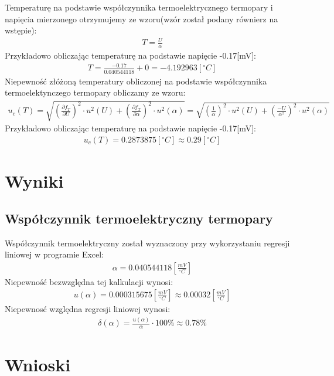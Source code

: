 \documentclass[11pt]{article}
\begin{document}
    \noindent Temperaturę na podstawie współczynnika termoelektrycznego termopary i napięcia mierzonego otrzymujemy ze wzoru(wzór został podany równierz na wstępie):
    \begin{gather*}
        T=\frac{U}{\alpha}
    \end{gather*}
    \noindent Przykładowo obliczając temperaturę na podstawie napięcie -0.17[mV]:
    \begin{gather*}
        T=\frac{-0.17}{0.040544118}+0=-4.192963[^{\circ}C]
    \end{gather*}
    \noindent Niepewność złóżoną temperatury obliczonej na podstawie współczynnika termoelektynczego termopary obliczamy ze wzoru:
    \begin{gather*}
        u_c(T)=\sqrt{(\frac{\partial f_T}{\partial U})^2\cdot u^2(U)+(\frac{\partial f_T}{\partial \alpha})^2\cdot u^2(\alpha)}=
        \sqrt{(\frac{1}{\alpha})^2\cdot u^2(U)+(\frac{-U}{\alpha^2})^2\cdot u^2(\alpha)}
    \end{gather*}
    \noindent Przykładowo obliczając temperaturę na podstawie napięcie -0.17[mV]:
    \begin{gather*}
        u_c(T)= 0.2873875[^\circ C]\approx 0.29[^\circ C]
    \end{gather*}

    \section{Wyniki}
    \subsection*{Współczynnik termoelektryczny termopary}
    Współczynnik termoelektryczny został wyznaczony przy wykorzystaniu regresji liniowej w programie Excel:
    \begin{gather*}
        \alpha=0.040544118[\frac{mV}{^\circ C}]
    \end{gather*}
    Niepewność bezwzględna tej kalkulacji wynosi:
    \begin{gather*}
        u(\alpha)=0.000315675[\frac{mV}{^\circ C}]\approx 0.00032[\frac{mV}{^\circ C}]
    \end{gather*}
    Niepewnosć względna regresji liniowej wynosi:
    \begin{gather*}
        \delta(\alpha)=\frac{u(\alpha)}{\alpha}\cdot 100\%\approx 0.78\%
    \end{gather*}

    \section{Wnioski}
\end{document}
